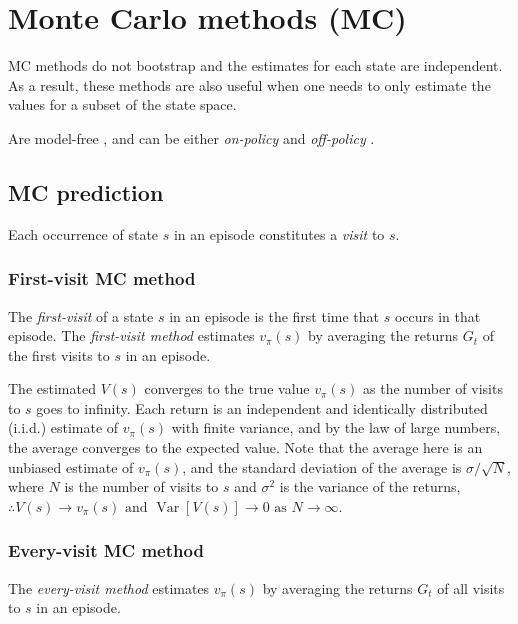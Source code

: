 \section{Monte Carlo methods (MC)}

MC methods do not bootstrap  and the estimates for each state are independent.
As a result, these methods are also useful when one needs to only estimate the values for a subset of the state space.

Are model-free , and can be either \textit{on-policy} and \textit{off-policy} .

\subsection{MC prediction}

Each occurrence of state \( s \) in an episode constitutes a \textit{visit} to \( s \).

\subsubsection{First-visit MC method}

The \textit{first-visit} of a state \( s \) in an episode is the first time that \( s \) occurs in that episode.
The \textit{first-visit method} estimates \( v_\pi(s) \) by averaging the returns \( G_t \) of the first visits to \( s \) in an episode.

The estimated \( V(s) \) converges to the true value \( v_\pi(s) \) as the number of visits to \( s \) goes to infinity.
Each return is an independent and identically distributed (i.i.d.) estimate of \( v_\pi(s) \) with finite variance, and by the law of large numbers, the average converges to the expected value.
Note that the average here is an unbiased estimate of \( v_\pi(s) \), and the standard deviation of the average is \( \sigma / \sqrt{N} \), where \( N \) is the number of visits to \( s \) and \( \sigma^2 \) is the variance of the returns, \( \therefore V(s) \to v_\pi(s) \text{ and } \operatorname{Var}[V(s)] \to 0 \text{ as } N \to \infty \).

\subsubsection{Every-visit MC method}

The \textit{every-visit method} estimates \( v_\pi(s) \) by averaging the returns \( G_t \) of all visits to \( s \) in an episode.

